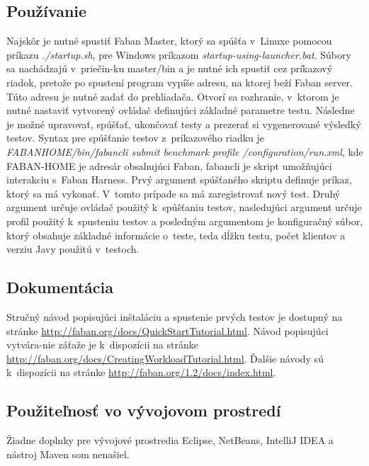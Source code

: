 \documentclass[12pt,oneside,final]{fithesis-utf8}
\newcommand\underscore[1]{\underline{\hspace{8pt}}}
\begin{document}
\subsection{Používanie}
Najskôr je nutné spustiť Faban Master, ktorý sa spúšťa v~Linuxe pomocou príkazu \textit{./startup.sh}, pre Windows príkazom \textit{startup-using-launcher.bat}. Súbory sa nachádzajú v~priečin-ku master/bin a je nutné ich spustiť cez príkazový riadok, pretože po spustení program vypíše adresu, na ktorej beží Faban server. Túto adresu je nutné zadať do prehliadača. Otvorí sa rozhranie, v~ktorom je nutné nastaviť vytvorený ovládač definujúci základné parametre testu. Následne je možné upravovať, spúšťať, ukončovať testy a prezerať si vygenerované výsledký testov. Syntax pre spúšťanie testov z~príkazového riadku je \textit{FABAN\underscore{}HOME/bin/fabancli submit benchmark profile /configuration/run.xml}, kde FABAN\underscore{}-HOME je adresár obsahujúci Faban, fabancli je skript umožňujúci interakciu s~Faban Harness. Prvý argument spúšťaného skriptu definuje príkaz, ktorý sa má vykonať. V~tomto prípade sa má zaregistrovať nový test. Druhý argument určuje ovládač použitý k~spúšťaniu testov, nasledujúci argument určuje profil použitý k~spusteniu testov a posledným argumentom je konfiguračný súbor, ktorý obsahuje základné informácie o~teste, teda dĺžku testu, počet klientov a verziu Javy použitú v~testoch.

\subsection{Dokumentácia}
Stručný návod popisujúci inštaláciu a spustenie prvých testov je dostupný na stránke \url{http://faban.org/docs/QuickStartTutorial.html}. Návod popisujúci vytvára-nie záťaže je k~dispozícii na stránke \url{http://faban.org/docs/CreatingWorkloadTutorial.html}. Ďalšie návody sú k~dispozícii na stránke \url{http://faban.org/1.2/docs/index.html}.

\subsection{Použiteľnosť vo vývojovom prostredí}
Žiadne doplnky pre vývojové prostredia Eclipse, NetBeans, IntelliJ IDEA a nástroj Maven som nenašiel.
\end{document}
